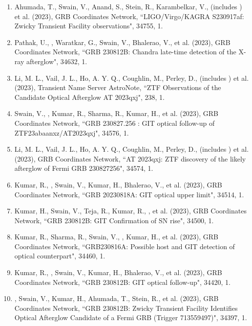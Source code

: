 \begin{enumerate}[leftmargin=*]
\item Ahumada, T., Swain, V., Anand, S., Stein, R., Karambelkar, V., (includes \me) et al. (2023), GRB Coordinates Network, {``LIGO/Virgo/KAGRA S230917af: Zwicky Transient Facility observations"}, 34755, 1.

\item Pathak, U., \me, Waratkar, G., Swain, V., Bhalerao, V., et al. (2023), GRB Coordinates Network, {``GRB 230812B: Chandra late-time detection of the X-ray afterglow"}, 34632, 1.

\item Li, M. L., Vail, J. L., Ho, A. Y. Q., Coughlin, M., Perley, D., (includes \me) et al. (2023), Transient Name Server AstroNote, {``ZTF Observations of the Candidate Optical Afterglow AT 2023qxj"}, 238, 1.

\item Swain, V., \me, Kumar, R., Sharma, R., Kumar, H., et al. (2023), GRB Coordinates Network, {``GRB 230827.256 : GIT optical follow-up of ZTF23abaanxz/AT2023qxj"}, 34576, 1.

\item Li, M. L., Vail, J. L., Ho, A. Y. Q., Coughlin, M., Perley, D., (includes \me) et al. (2023), GRB Coordinates Network, {``AT 2023qxj: ZTF discovery of the likely afterglow of Fermi GRB 230827256"}, 34574, 1.

\item Kumar, R., \me, Swain, V., Kumar, H., Bhalerao, V., et al. (2023), GRB Coordinates Network, {``GRB 20230818A: GIT optical upper limit"}, 34514, 1.

\item Kumar, H., Swain, V., Teja, R., Kumar, R., \me, et al. (2023), GRB Coordinates Network, {``GRB 230812B: GIT Confirmation of SN rise"}, 34500, 1.

\item Kumar, R., Sharma, R., Swain, V., \me, Kumar, H., et al. (2023), GRB Coordinates Network, {``GRB230816A: Possible host and GIT detection of optical counterpart"}, 34460, 1.

\item Kumar, R., \me, Swain, V., Kumar, H., Bhalerao, V., et al. (2023), GRB Coordinates Network, {``GRB 230812B: GIT optical follow-up"}, 34420, 1.

\item \me, Swain, V., Kumar, H., Ahumada, T., Stein, R., et al. (2023), GRB Coordinates Network, {``GRB 230812B: Zwicky Transient Facility Identifies Optical Afterglow Candidate of a Fermi GRB (Trigger 713559497)"}, 34397, 1.


\end{enumerate}
